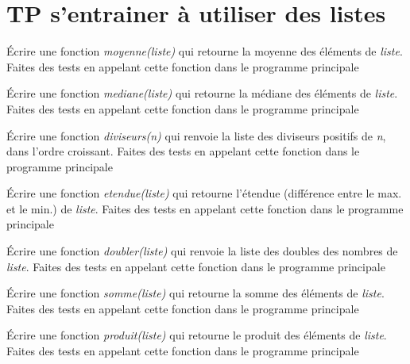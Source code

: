 \chapter*{TP s'entrainer à utiliser des listes}

\begin{Exercise}[title={Moyenne}]
\Question Écrire une fonction  \textit{moyenne(liste)} qui retourne la moyenne des éléments de  \textit{liste}.
\Question Faites des tests en appelant cette fonction dans le programme principale
\end{Exercise}

\begin{Exercise}[title={Médiane}]
\Question Écrire une fonction  \textit{mediane(liste)} qui retourne la médiane des éléments de  \textit{liste}.
\Question Faites des tests en appelant cette fonction dans le programme principale
\end{Exercise}

\begin{Exercise}[title={Diviseurs d'un entier}]
\Question Écrire une fonction  \textit{diviseurs(n)} qui renvoie la liste des diviseurs positifs de  \textit{n}, dans l'ordre croissant.
\Question Faites des tests en appelant cette fonction dans le programme principale
\end{Exercise}

\begin{Exercise}[title={Étendue}]
\Question Écrire une fonction \textit{etendue(liste)} qui retourne l'étendue (différence entre le max. et le min.) de  \textit{liste}.
\Question Faites des tests en appelant cette fonction dans le programme principale
\end{Exercise}

\begin{Exercise}[title={Doubles}]
\Question Écrire une fonction  \textit{doubler(liste)} qui renvoie la liste des doubles des nombres de  \textit{liste}. 
\Question Faites des tests en appelant cette fonction dans le programme principale
\end{Exercise}

\begin{Exercise}[title={ Somme des éléments d'une liste}]
\Question Écrire une fonction  \textit{somme(liste)} qui retourne la somme des éléments de  \textit{liste}.
\Question Faites des tests en appelant cette fonction dans le programme principale
\end{Exercise}

\begin{Exercise}[title={Produit des éléments d'une liste}]
\Question Écrire une fonction  \textit{produit(liste)} qui retourne le produit des éléments de  \textit{liste}.
\Question Faites des tests en appelant cette fonction dans le programme principale
\end{Exercise}

